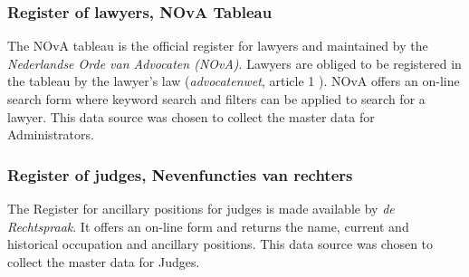 \subsubsection{Register of lawyers, NOvA Tableau}\label{NOvA Tableau}
The NOvA tableau is the official register for lawyers and maintained by the \textit{Nederlandse Orde van Advocaten (NOvA)}\cite{nova:1}. Lawyers are obliged to be registered in the tableau by the lawyer's law (\textit{advocatenwet}, article 1 \cite{law:2}). NOvA offers an on-line search form where keyword search and filters can be applied to search for a lawyer. This data source was chosen to collect the master data for Administrators. 

\subsubsection{Register of judges, Nevenfuncties van rechters}\label{Nevenfuncties Rechters}
The Register for ancillary positions for judges is made available by \textit{de Rechtspraak}\cite{rechtspraak:nevenfuncties}. It offers an on-line form and returns the name, current and historical occupation and ancillary positions. This data source was chosen to collect the master data for Judges.